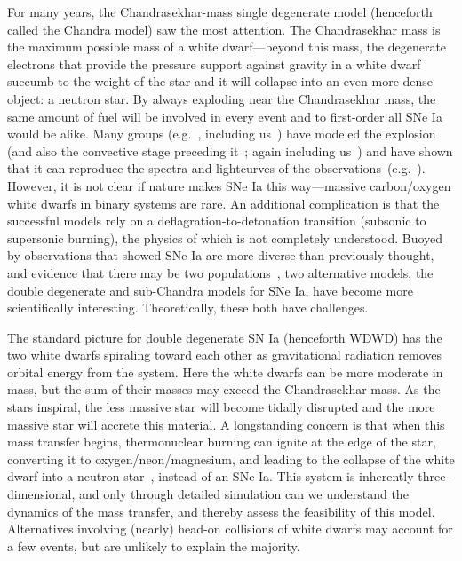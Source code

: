 \documentclass[11pt,letterpaper,english]{article}
\begin{document}
For many years, the Chandrasekhar-mass single degenerate model
(henceforth called the Chandra model) saw the most attention.  The
Chandrasekhar mass is the maximum possible mass of a white
dwarf---beyond this mass, the degenerate electrons that provide the
pressure support against gravity in a white dwarf succumb to the
weight of the star and it will collapse into an even more dense
object: a neutron star.  By always exploding near the Chandrasekhar
mass, the same amount of fuel will be involved in every event and to
first-order all SNe Ia would be alike.  Many groups
(e.g.~\cite{gamezo:2005,Roe07,Jor08}, including us~\cite{Kru12,Ma13})
have modeled the explosion (and also the convective stage
preceding it~\cite{hoflichstein:2002}; again including us~\cite{Non12}) and have shown that it can reproduce the
spectra and lightcurves of the observations~(e.g.~\cite{Blo11}).
However, it is not clear if nature makes SNe Ia this way---massive
carbon/oxygen white dwarfs in binary systems are rare.  An additional
complication is that the successful models rely on a
deflagration-to-detonation transition (subsonic to supersonic
burning), the physics of which is not completely understood.  Buoyed by
observations that showed SNe Ia are more diverse than previously
thought, and evidence that there may be two
populations~\cite{MannucciEtAl06,howelletal+09,How11}, two
alternative models, the double
degenerate and sub-Chandra models for SNe Ia, have become more
scientifically interesting.  Theoretically, these both have
challenges.

The standard picture for double degenerate SN Ia (henceforth WDWD) has the
two white dwarfs spiraling toward each other as gravitational radiation
removes orbital energy from the system.  Here the white dwarfs can be more
moderate in mass, but the sum of their masses may exceed the
Chandrasekhar mass.  As the stars inspiral, the less massive star will
become tidally disrupted and the more massive star will accrete this
material.  A longstanding concern is that when this mass transfer
begins, thermonuclear burning can ignite at the edge of the star,
converting it to oxygen/neon/magnesium, and leading to the collapse of
the white dwarf into a neutron
star~\cite{saionomoto:2004,fryerdiehl:2008}, instead of an SNe Ia.
This system is inherently three-dimensional, and only through detailed
simulation can we understand the dynamics of the mass transfer, and
thereby assess the feasibility of this model.  Alternatives involving
(nearly) head-on collisions of white dwarfs may account for a few
events, but are unlikely to explain the majority.
\end{document}
